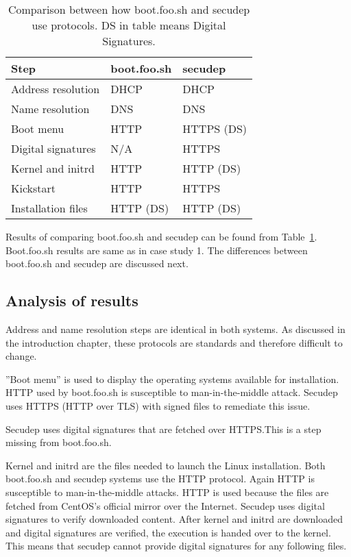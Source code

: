 \begin{table}[!ht]
  \def\arraystretch{1.1}%
  \begin{center}
    \caption{Comparison between how boot.foo.sh and secudep use
      protocols. DS in table means Digital
      Signatures.\label{tab:comparison_table}}
    \begin{tabular}{| l | l | l |}
      \hline
      Step               & boot.foo.sh   & secudep    \\
      \hline
      Address resolution & DHCP          & DHCP       \\
      Name resolution    & DNS           & DNS        \\
      Boot menu          & HTTP          & HTTPS (DS) \\
      Digital signatures & N/A           & HTTPS      \\
      Kernel and initrd  & HTTP          & HTTP (DS)  \\
      Kickstart          & HTTP          & HTTPS      \\
      Installation files & HTTP (DS)     & HTTP (DS)  \\
      \hline
    \end{tabular}
  \end{center}
\end{table}

Results of comparing boot.foo.sh and secudep can be found from
Table~\ref{tab:comparison_table}. Boot.foo.sh results are same as in
case study 1. The differences between boot.foo.sh and secudep are
discussed next.


\subsection{Analysis of results}

Address and name resolution steps are identical in both systems. As
discussed in the introduction chapter, these protocols are standards
and therefore difficult to change.

''Boot menu'' is used to display the operating systems available for
installation. HTTP used by boot.foo.sh is susceptible to
man-in-the-middle attack. Secudep uses HTTPS (HTTP over TLS) with
signed files to remediate this issue.

Secudep uses digital signatures that are fetched over HTTPS.\@ This is
a step missing from boot.foo.sh.

Kernel and initrd are the files needed to launch the Linux
installation. Both boot.foo.sh and secudep systems use the HTTP
protocol. Again HTTP is susceptible to man-in-the-middle attacks. HTTP
is used because the files are fetched from CentOS's official mirror
over the Internet. Secudep uses digital signatures to verify
downloaded content. After kernel and initrd are downloaded and digital
signatures are verified, the execution is handed over to the
kernel. This means that secudep cannot provide digital signatures for
any following files.


